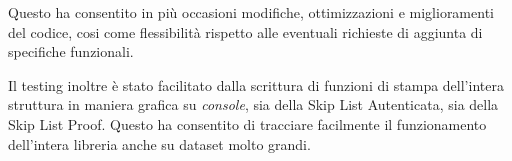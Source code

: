 	Questo ha consentito in più occasioni modifiche, ottimizzazioni e miglioramenti del codice, cosi come flessibilità rispetto alle eventuali richieste di aggiunta di specifiche funzionali.

	Il testing inoltre è stato facilitato dalla scrittura di funzioni di stampa dell'intera struttura in maniera grafica su \textit{console}, sia della Skip List Autenticata, sia della Skip List Proof. Questo ha consentito di tracciare facilmente il funzionamento dell'intera libreria anche su dataset molto grandi.



%
%	
%	
%		
%	
